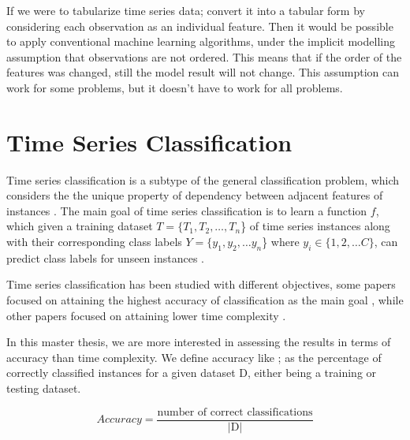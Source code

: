 If we were to tabularize time series data; convert it into a tabular form by considering each observation as an individual feature.
Then it would be possible to apply conventional machine learning algorithms, under the implicit modelling assumption that observations are not ordered.
This means that if the order of the features was changed, still the model result will not change.
This assumption can work for some problems, but it doesn't have to work for all problems.

\section{Time Series Classification}
\label{TimeSeriesClassification}
Time series classification is a subtype of the general classification problem, which considers the the unique property of dependency between adjacent features of instances \cite{Bostrom2017}.
The main goal of time series classification is to learn a function $f$,
which given a training dataset $T = \{T_{1},T_{2}, \ldots ,T_{n}$\} of time series instances
along with their corresponding class labels $Y=\{y_{1},y_{2}, \ldots y_{n}$\} where $y_{i} \in \{1,2, \ldots C\}$,
can predict class labels for unseen instances \cite{deng2013time}.

Time series classification has been studied with different objectives, some papers focused on attaining the highest accuracy of classification as the main goal \cite{kate2016using,jeong2011weighted,bostrom2017shapelet,lines2018time,schafer2017multivariate,fawaz2020inceptiontime},
while other papers focused on attaining lower time complexity \cite{ratanamahatana2004making,bagnall2017great,tan2020fastee,petitjean2016faster,schafer2017fast}.

In this master thesis, we are more interested in assessing the results in terms of accuracy than time complexity. We define accuracy like \cite{schafer2020teaser}; 
as the percentage of correctly classified instances for a given dataset D, either being a training or testing dataset.
\begin{definition}
    \[ \textstyle Accuracy = \frac{ \text{number of correct classifications}}{|\text{D}|} \]
\end{definition}

